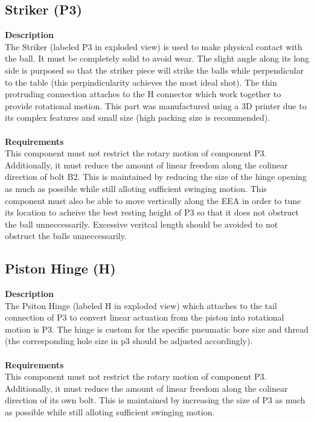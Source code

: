 \documentclass[titlepage]{article}
\begin{document}
\begin{center}
\begin{center}
\begin{center}
\begin{center}
\begin{center}
\begin{center}
\begin{center}
\begin{center}
\begin{center}
\begin{center}
\begin{center}
\begin{center}
\begin{center}
\begin{center}
\subsection{Striker (P3)}
\textbf{Description}\\
The Striker (labeled P3 in exploded view) is used to make physical contact with the ball. It must be completely solid to avoid wear. The slight angle along its long side is purposed so that the striker piece will strike the balls while perpendicular to the table (this perpindicularity achieves the most ideal shot). The thin protruding connection attaches to the H connector which work together to provide rotational motion. This part was manufactured using a 3D printer due to its complex features and small size (high packing size is recommended).\\\\
\textbf{Requirements}\\
This component must not restrict the rotary motion of component P3. Additionally, it must reduce the amount of linear freedom along the colinear direction of bolt B2. This is maintained by reducing the size of the hinge opening as much as possible while still alloting sufficient swinging motion. This component must also be able to move vertically along the EEA in order to tune its location to acheive the best resting height of P3 so that it does not obstruct the ball unneccessarily. Excessive veritcal length should be avoided to not obstruct the balls unneccessarily.


\subsection{Piston Hinge (H)}
\textbf{Description}\\
The Psiton Hinge (labeled H in exploded view) which attaches to the tail connection of P3 to convert linear actuation from the piston into rotational motion is P3. The hinge is custom for the specific pneumatic bore size and thread (the corresponding hole size in p3 should be adjusted accordingly).\\\\
\textbf{Requirements}\\
This component must not restrict the rotary motion of component P3. Additionally, it must reduce the amount of linear freedom along the colinear direction of its own bolt. This is maintained by increasing the size of P3 as much as possible while still alloting sufficient swinging motion. 


\end{center}
\end{center}
\end{center}
\end{center}
\end{center}
\end{center}
\end{center}
\end{center}
\end{center}
\end{center}
\end{center}
\end{center}
\end{center}
\end{center}
\end{document}
